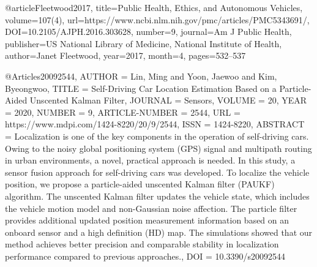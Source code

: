 


@article{Fleetwood2017,
   title={Public Health, Ethics, and Autonomous Vehicles},
   volume={107(4)},
   url={https://www.ncbi.nlm.nih.gov/pmc/articles/PMC5343691/},
   DOI={10.2105/AJPH.2016.303628},
   number={9},
   journal={Am J Public Health},
   publisher={US National Library of Medicine, National Institute of Health},
   author={Janet Fleetwood},
   year={2017},
   month={4},
   pages={532–537}
}

@Article{s20092544,
    AUTHOR = {Lin, Ming and Yoon, Jaewoo and Kim, Byeongwoo},
    TITLE = {Self-Driving Car Location Estimation Based on a Particle-Aided Unscented Kalman Filter},
    JOURNAL = {Sensors},
    VOLUME = {20},
    YEAR = {2020},
    NUMBER = {9},
    ARTICLE-NUMBER = {2544},
    URL = {https://www.mdpi.com/1424-8220/20/9/2544},
    ISSN = {1424-8220},
    ABSTRACT = {Localization is one of the key components in the operation of self-driving cars. Owing to the noisy global positioning system (GPS) signal and multipath routing in urban environments, a novel, practical approach is needed. In this study, a sensor fusion approach for self-driving cars was developed. To localize the vehicle position, we propose a particle-aided unscented Kalman filter (PAUKF) algorithm. The unscented Kalman filter updates the vehicle state, which includes the vehicle motion model and non-Gaussian noise affection. The particle filter provides additional updated position measurement information based on an onboard sensor and a high definition (HD) map. The simulations showed that our method achieves better precision and comparable stability in localization performance compared to previous approaches.},
    DOI = {10.3390/s20092544}
}